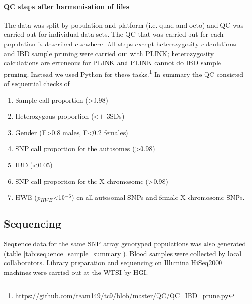 \paragraph{QC steps after harmonisation of files}
The data was split by population and platform (i.e. quad and octo) and \gls{QC} was carried out for individual data sets. The \gls{QC} that was carried out for each population is described elsewhere.\cite{Gurdasani2015} All steps except heterozygosity calculations and IBD sample pruning were carried out with PLINK; heterozygosity calculations are erroneous for PLINK and PLINK cannot do \gls{IBD} sample pruning. Instead we used Python for these tasks.\footnote{\url{https://github.com/team149/tc9/blob/master/QC/QC_IBD_prune.py}} In summary the QC consisted of sequential checks of
\begin{enumerate}
\item Sample call proportion (>0.98)
\item Heterozygous proportion (\textless $\pm$ 3\glspl{SD})
\item Gender (F>0.8 males, F<0.2 females)
\item SNP call proportion for the autosomes (\textgreater0.98)
\item IBD (<0.05)
\item SNP call proportion for the X chromosome (\textgreater0.98)
\item \gls{HWE} (\textit{p}$_{HWE}$<10$^{-6}$) on all autosomal SNPs and female X chromosome SNPs.
\end{enumerate}

\subsection{Sequencing}
\label{subsec:sequence}
Sequence data for the same SNP array genotyped populations was also generated (table \ref{tab:sequence_sample_summary}). Blood samples were collected by local collaborators. Library preparation and sequencing on Illumina HiSeq2000 machines were carried out at the \gls{WTSI} by \gls{HGI}.



